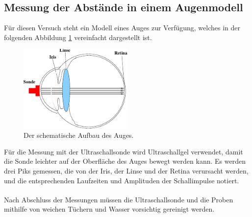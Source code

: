 \subsection{Messung der Abstände in einem Augenmodell}

    Für diesen Versuch steht ein Modell eines Auges zur Verfügung,
    welches in der folgenden Abbildung \ref{fig:augenmodell} vereinfacht dargestellt ist.

    \begin{figure}[H]
        \centering
        \includegraphics[width=0.5\textwidth]{content/img/Abb_2.pdf}
        \caption{Der schematische Aufbau des Auges.}
        \label{fig:augenmodell}
    \end{figure}

    Für die Messung mit der Ultraschallsonde wird Ultraschallgel verwendet,
    damit die Sonde leichter auf der Oberfläche des Auges bewegt werden kann.
    Es werden drei Piks gemessen,
    die von der Iris, der Linse und der Retina verursacht werden,
    und die entsprechenden Laufzeiten und Amplituden der Schallimpulse notiert.\\
    \\
    Nach Abschluss der Messungen müssen die Ultraschallsonde und die Proben mithilfe von weichen Tüchern und Wasser vorsichtig gereinigt werden.